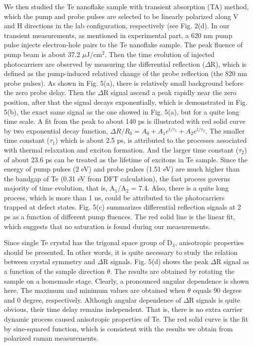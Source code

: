 \documentclass[journal=jacsat,manuscript=article]{achemso}
\begin{document}
We then studied the Te nanoflake sample with transient absorption (TA) method, which the pump and probe pulses are selected to be linearly polarized along V and H directions in the lab configuration, respectively (see Fig. 2(d). In our transient measurements, as mentioned in experimental part, a 620 nm pump pulse injects electron-hole pairs to the Te nanoflake sample. The peak fluence of pump beam is about 37.2 $\mu$J/cm$^2$. Then the time evolution of injected photocarriers are observed by measuring the differential reflection ($\Delta$R), which is defined as the pump-induced relatived change of the probe reflection (the 820 nm probe pulses). As shown in Fig. 5(a), there is relatively small background before the zero probe delay. Then the $\Delta$R signal ascend a peak rapidly near the zero position, after that the signal decays exponentially, which is demonstrated in Fig. 5(b), the exact same signal as the one showed in Fig. 5(a), but for a quite long time scale. A fit from the peak to about 140 ps is illustrated with red solid curve by two exponential decay function, $\Delta R/R_0= A_0 +A_1 e^{t/\tau_1}+A_2 e^{t/\tau_2}$. The smaller time constant ($\tau_1$) which is about 2.5 ps, is attributed to the processes associated with thermal relaxation and exciton formation. And the larger time constant ($\tau_2$) of about 23.6 ps can be treated as the lifetime of excitons in  Te sample. Since the energy of pump pulses (2 eV) and probe pulses (1.51 eV) are much higher than the bandgap of Te (0.31 eV from DFT calculation), the fast process governs majority of time evolution, that is, A$_1$/A$_2$ = 7.4. Also, there is a quite long process, which is more than 1 ns, could be attributed to the photocarriers trapped at defect states. Fig. 5(c) summarizes differential reflection signals at 2 ps as a function of different pump fluences. The red solid line is the linear fit, which suggests that  no saturation is found during our measurements.

Since single Te crystal has the trigonal space group of D$_3$, anisotropic properties should be presented. In other words, it is quite necessary to study the relation between crystal symmetry and $\Delta$R signals. Fig. 5(d) shows the peak $\Delta$R signal as a function of the sample direction  $\theta$. The results are obtained by rotating the sample on a homemade stage. Clearly, a pronounced angular dependence is shown here. The maximum and minimum values are obtained when $\theta$ equals 90 degree and 0 degree, respectively. Although angular dependence of $\Delta$R signals is quite obvious, their time delay remains independent. That is, there is no extra carrier dynamic process caused anisotropic properties of Te. The red solid curve is the fit by sine-squared function, which is consistent with the results we obtain from polarized raman measurements.  
\end{document}
